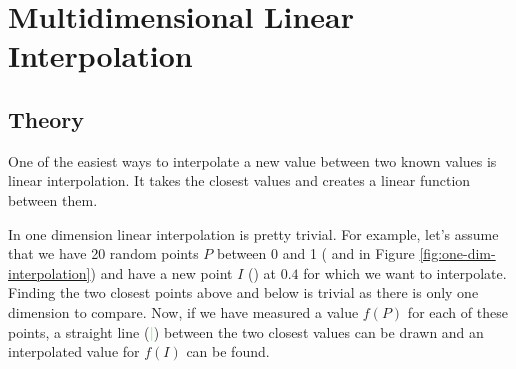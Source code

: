 \section{Multidimensional Linear Interpolation}

\subsection{Theory}

One of the easiest ways to interpolate a new value between two known values is linear interpolation. It takes the closest values and creates a linear function between them.

In one dimension linear interpolation is pretty trivial. For example, let's assume that we have 20 random points $P$ between 0 and 1 (\textcolor{Red}{\textbullet} and  \textcolor{Blue}{\textbullet} in Figure \ref{fig:one-dim-interpolation}) and have a new point $I$ (\textcolor{Green}{\textbullet}) at $0.4$ for which we want to interpolate. Finding the two closest points \textcolor{Red}{\textbullet} above and below is trivial as there is only one dimension to compare. Now, if we have measured a value $f(P)$ for each of these points, a straight line (\textcolor{LightGreen}{\textbf{|}}) between the two closest values can be drawn and an interpolated value for $f(I)$ can be found. 



